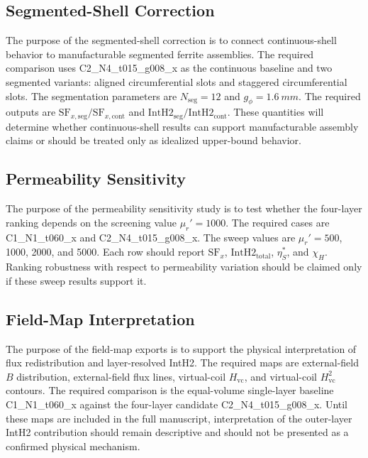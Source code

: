 ﻿\documentclass[letterpaper,journal]{IEEEtran}
\begin{document}
\subsection{Segmented-Shell Correction}

The purpose of the segmented-shell correction is to connect continuous-shell behavior to manufacturable segmented ferrite assemblies. The required comparison uses C2\_N4\_t015\_g008\_x as the continuous baseline and two segmented variants: aligned circumferential slots and staggered circumferential slots. The segmentation parameters are $N_{\mathrm{seg}}=12$ and $g_\phi=\SI{1.6}{mm}$. The required outputs are $\mathrm{SF}_{x,\mathrm{seg}}/\mathrm{SF}_{x,\mathrm{cont}}$ and $\mathrm{IntH2}_{\mathrm{seg}}/\mathrm{IntH2}_{\mathrm{cont}}$. These quantities will determine whether continuous-shell results can support manufacturable assembly claims or should be treated only as idealized upper-bound behavior.

\subsection{Permeability Sensitivity}

The purpose of the permeability sensitivity study is to test whether the four-layer ranking depends on the screening value $\mu_r'=1000$. The required cases are C1\_N1\_t060\_x and C2\_N4\_t015\_g008\_x. The sweep values are $\mu_r'=500$, 1000, 2000, and 5000. Each row should report $\mathrm{SF}_x$, $\mathrm{IntH2}_{\mathrm{total}}$, $\eta_S^*$, and $\chi_H$. Ranking robustness with respect to permeability variation should be claimed only if these sweep results support it.

\subsection{Field-Map Interpretation}

The purpose of the field-map exports is to support the physical interpretation of flux redistribution and layer-resolved IntH2. The required maps are external-field $B$ distribution, external-field flux lines, virtual-coil $H_{\mathrm{vc}}$, and virtual-coil $H_{\mathrm{vc}}^2$ contours. The required comparison is the equal-volume single-layer baseline C1\_N1\_t060\_x against the four-layer candidate C2\_N4\_t015\_g008\_x. Until these maps are included in the full manuscript, interpretation of the outer-layer IntH2 contribution should remain descriptive and should not be presented as a confirmed physical mechanism.
\end{document}
